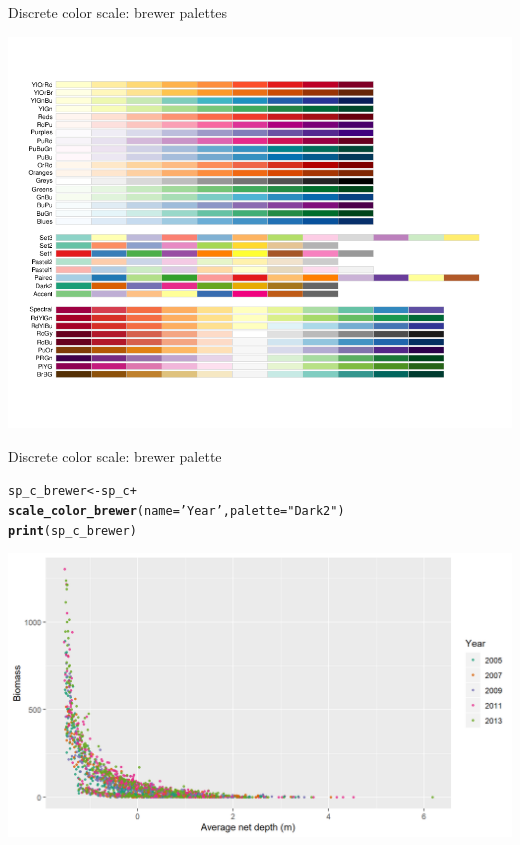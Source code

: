 \documentclass{beamer}\usepackage[]{graphicx}\usepackage[]{color}
\makeatletter
\newcommand{\hlstr}[1]{\textcolor[rgb]{0.192,0.494,0.8}{#1}}%
\newcommand{\hlopt}[1]{\textcolor[rgb]{0,0,0}{#1}}%
\newcommand{\hlstd}[1]{\textcolor[rgb]{0.345,0.345,0.345}{#1}}%
\newcommand{\hlkwb}[1]{\textcolor[rgb]{0.69,0.353,0.396}{#1}}%
\newcommand{\hlkwc}[1]{\textcolor[rgb]{0.333,0.667,0.333}{#1}}%
\newcommand{\hlkwd}[1]{\textcolor[rgb]{0.737,0.353,0.396}{\textbf{#1}}}%
\newenvironment{kframe}{%
 \def\at@end@of@kframe{}%
 \ifinner\ifhmode%
  \def\at@end@of@kframe{\end{minipage}}%
  \begin{minipage}{\columnwidth}%
 \fi\fi%
 \def\FrameCommand##1{\hskip\@totalleftmargin \hskip-\fboxsep
 \colorbox{shadecolor}{##1}\hskip-\fboxsep
     \hskip-\linewidth \hskip-\@totalleftmargin \hskip\columnwidth}%
 \MakeFramed {\advance\hsize-\width
   \@totalleftmargin\z@ \linewidth\hsize
   \@setminipage}}%
 {\par\unskip\endMakeFramed%
 \at@end@of@kframe}
\newenvironment{knitrout}{}{} %
\makeatother
\begin{document}
\begin{frame}[fragile]{Discrete color scale: brewer palettes}
\vspace{-0.5cm}
\begin{center}
\includegraphics[scale=0.35]{colorbrewer_names.png}
\end{center}
\end{frame}

\begin{frame}[fragile]{Discrete color scale: brewer palette}
\begin{knitrout}\footnotesize
{}\color{fgcolor}\begin{kframe}
\begin{alltt}
\hlstd{sp_c_brewer} \hlkwb{<-} \hlstd{sp_c} \hlopt{+}
  \hlkwd{scale_color_brewer}\hlstd{(}\hlkwc{name}\hlstd{=}\hlstr{'Year'}\hlstd{,} \hlkwc{palette}\hlstd{=}\hlstr{"Dark2"}\hlstd{)}
\hlkwd{print}\hlstd{(sp_c_brewer)}
\end{alltt}
\end{kframe}

{\centering \includegraphics[width=.9\linewidth]{figure/sp_discrete_color4-1} 

}



\end{knitrout}
\end{frame}
\end{document}
